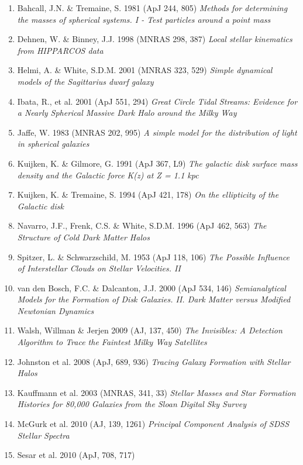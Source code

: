 \documentclass[10pt]{article}
\begin{document}
\begin{enumerate}
\item Bahcall, J.N. \& Tremaine, S. 1981 (ApJ 244, 805)
       {\it Methods for determining the masses of spherical systems. I - Test particles around a point mass}
\item Dehnen, W. \& Binney, J.J. 1998 (MNRAS 298, 387)
          {\it Local stellar kinematics from HIPPARCOS data}
\item Helmi, A. \& White, S.D.M. 2001 (MNRAS 323, 529)
         {\it Simple dynamical models of the Sagittarius dwarf galaxy}
\item Ibata, R., et al. 2001 (ApJ 551, 294)
         {\it Great Circle Tidal Streams: Evidence for a Nearly Spherical Massive Dark Halo around the Milky Way}
\item Jaffe, W. 1983 (MNRAS 202, 995) 
          {\it A simple model for the distribution of light in spherical galaxies}
\item Kuijken, K. \& Gilmore, G. 1991 (ApJ 367, L9)  
     {\it The galactic disk surface mass density and the Galactic force K(z) at Z = 1.1 kpc}
\item Kuijken, K. \& Tremaine, S. 1994 (ApJ 421, 178)
            {\it On the ellipticity of the Galactic disk}
\item Navarro, J.F., Frenk, C.S. \& White, S.D.M. 1996 (ApJ 462, 563) 
         {\it The Structure of Cold Dark Matter Halos}              
\item Spitzer, L. \& Schwarzschild, M. 1953 (ApJ 118, 106) 
           {\it The Possible Influence of Interstellar Clouds on Stellar Velocities. II}
\item van den Bosch, F.C. \& Dalcanton, J.J. 2000 (ApJ 534, 146)
         {\it Semianalytical Models for the Formation of 
               Disk Galaxies. II. Dark Matter versus Modified Newtonian Dynamics}
\item Walsh, Willman \& Jerjen 2009 (AJ, 137, 450) 
   {\it The Invisibles: A Detection Algorithm to Trace the Faintest Milky Way Satellites}  
\item Johnston et al. 2008 (ApJ, 689, 936)
    {\it Tracing Galaxy Formation with Stellar Halos}
\item  Kauffmann et al. 2003 (MNRAS, 341, 33) 
   {\it Stellar Masses and Star Formation Histories for 80,000 Galaxies from the Sloan Digital Sky Survey} 
\item McGurk et al. 2010 (AJ, 139, 1261) 
     {\it Principal Component Analysis of SDSS Stellar Spectra}
\item Sesar et al. 2010 (ApJ, 708, 717)

\end{enumerate}
\end{document}

